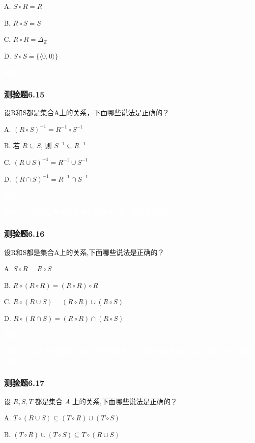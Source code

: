 \documentclass[UTF8, heading=true]{ctexart}
\begin{document}
A. $S \circ R=R$

B. $R \circ S=S$

C. $R \circ R=\Delta_{\mathbb{Z}}$

D. $S \circ S=\{\langle 0,0\rangle\}$

\textcolor{white}{答案：BC}

\subsubsection{测验题6.15}

设R和S都是集合A上的关系，下面哪些说法是正确的？

A. $(R \circ S)^{-1}=R^{-1} \circ S^{-1}$

B. 若 $R \subseteq S$, 则 $S^{-1} \subseteq R^{-1}$

C. $(R \cup S)^{-1}=R^{-1} \cup S^{-1}$

D. $(R \cap S)^{-1}=R^{-1} \cap S^{-1}$

\textcolor{white}{答案：CD}

\textcolor{white}{解析：关系逆运算保持子集关系且有C和D选项的性质。}

\subsubsection{测验题6.16}

设R和S都是集合A上的关系,下面哪些说法是正确的？

A. $S \circ R=R \circ S$

B. $R \circ(R \circ R)=(R \circ R) \circ R$

C. $R \circ(R \cup S)=(R \circ R) \cup(R \circ S)$

D. $R \circ(R \cap S)=(R \circ R) \cap(R \circ S)$

\textcolor{white}{答案：BC}

\textcolor{white}{解析：关系复合满足结合律，保持子集关系，对集合并有分配律，对集合交只满足包含关系$T \circ (R \cap S) \subseteq (T \circ R) \cap (T \circ S)$}



\subsubsection{测验题6.17}

设 $R, S, T$ 都是集合 $A$ 上的关系,下面哪些说法是正确的？

A. $T \circ (R \cup S) \subseteq (T \circ R) \cup (T \circ S)$

B. $ (T \circ R) \cup (T \circ S) \subseteq T \circ (R \cup S)$
\end{document}
